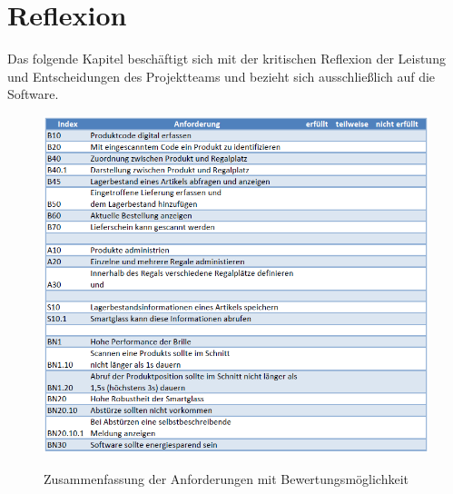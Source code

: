 %
%
%
%
%
%

\chapter{Reflexion}
Das folgende Kapitel beschäftigt sich mit der kritischen Reflexion der Leistung und Entscheidungen des Projektteams und bezieht sich ausschließlich auf die Software.\\

\begin{figure}[H]
	\centering
	{\includegraphics[scale=0.73]{Bilder/Abbildungen/anforderungen_zusammenfassung_bewertung.png}}
	\caption{Zusammenfassung der Anforderungen mit Bewertungsmöglichkeit}
	\label{fig:jwt_encode}
\end{figure}

